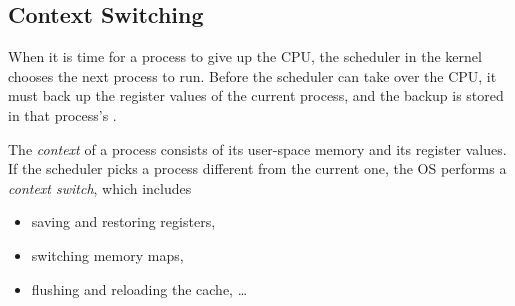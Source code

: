 \subsection{Context Switching}

When it is time for a process to give up the CPU, the scheduler in the kernel chooses the next process to run. Before the scheduler can take over the CPU, it must back up the register values of the current process, and the backup is stored in that process's \ts{}.

\begin{definition}
  The \emph{context} of a process consists of its user-space memory and its register values. If the scheduler picks a process different from the current one, the OS performs a \emph{context switch}, which includes
  \begin{itemize}
    \item saving and restoring registers,
    \item switching memory maps,
    \item flushing and reloading the cache, \dots
  \end{itemize}
\end{definition}

